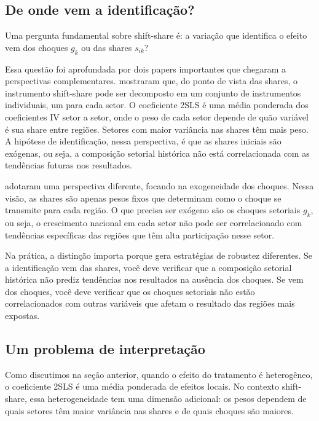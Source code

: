 \subsection*{De onde vem a identificação?}

Uma pergunta fundamental sobre shift-share é: a variação que identifica o efeito vem dos choques $g_k$ ou das shares $s_{ik}$?

Essa questão foi aprofundada por dois papers importantes que chegaram a perspectivas complementares. \citet{GoldsmithPinkhamSorkinSwift2020} mostraram que, do ponto de vista das shares, o instrumento shift-share pode ser decomposto em um conjunto de instrumentos individuais, um para cada setor. O coeficiente 2SLS é uma média ponderada dos coeficientes IV setor a setor, onde o peso de cada setor depende de quão variável é sua share entre regiões. Setores com maior variância nas shares têm mais peso. A hipótese de identificação, nessa perspectiva, é que as shares iniciais são exógenas, ou seja, a composição setorial histórica não está correlacionada com as tendências futuras nos resultados.

\citet{BorusyakHullJaravel2022} adotaram uma perspectiva diferente, focando na exogeneidade dos choques. Nessa visão, as shares são apenas pesos fixos que determinam como o choque se transmite para cada região. O que precisa ser exógeno são os choques setoriais $g_k$, ou seja, o crescimento nacional em cada setor não pode ser correlacionado com tendências específicas das regiões que têm alta participação nesse setor.

Na prática, a distinção importa porque gera estratégias de robustez diferentes. Se a identificação vem das shares, você deve verificar que a composição setorial histórica não prediz tendências nos resultados na ausência dos choques. Se vem dos choques, você deve verificar que os choques setoriais não estão correlacionados com outras variáveis que afetam o resultado das regiões mais expostas.

\subsection*{Um problema de interpretação}

Como discutimos na seção anterior, quando o efeito do tratamento é heterogêneo, o coeficiente 2SLS é uma média ponderada de efeitos locais. No contexto shift-share, essa heterogeneidade tem uma dimensão adicional: os pesos dependem de quais setores têm maior variância nas shares e de quais choques são maiores.

